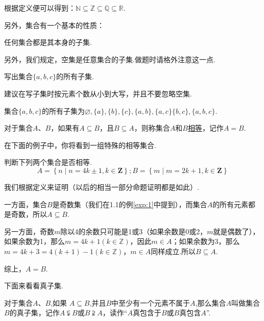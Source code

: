 \documentclass[lang=cn,math=cm,chinesefont=nofont,11pt,scheme=chinese,twocol]{elegantbook}
\begin{document}
根据定义便可以得到：$\mathbb{N}\subseteq\mathbb{Z}\subseteq\mathbb{Q}\subseteq\mathbb{R}$.

  另外，集合有一个基本的性质：
\begin{property}
  任何集合都是其本身的子集.
\end{property}

另外，我们规定，空集是任意集合的子集.做题时请格外注意这一点.

\begin{example}
  写出集合$\{a,b,c\}$的所有子集.
\end{example}
\begin{remark}
  建议在写子集时按元素个数从小到大写，并且不要忽略空集.
\end{remark}
\begin{solution}
  集合$\{a,b,c\}$的所有子集为$\varnothing ,\{a\},\{b\},\{c\},\{a,b\},\{a,c\}\{b,c\},\{a,b,c\}$.
\end{solution}
\begin{definition}[集合的相等]
  对于集合$A$、$B$，如果有$A\subseteq B$，且$B\subseteq A$，则称集合$A$和$B$\underline{相等}，记作$A=B$.
\end{definition}

在下面的例子中，你将看到一组特殊的相等集合.

\begin{example}\label{exp:2}
  判断下列两个集合是否相等.
  $$A=\left\{n\mid n=4k\pm1,k\in\mathbf{Z}\right\};B=\left\{m\mid m=2k+1,k\in\mathbf{Z}\right\}$$
\end{example}
\begin{solution}
  我们根据定义来证明（以后的相当一部分命题证明都是如此）.

一方面，集合$B$是奇数集（我们在1.1的例\ref{exp:1}中提到），而集合$A$的所有元素都是奇数，所以$A\subseteq B$.

另一方面，奇数$m$除以4的余数只可能是1或3（如果余数是0或2，$m$就是偶数了），如果余数为1，那么$m=4k+1(k\in\mathbb{Z})$，因此$m\in A$；如果余数为3，那么$m=4k+3=4(k+1)-1(k\in\mathbb{Z})$，$m\in A$同样成立.所以$B\subseteq A$.

综上，$A=B$.
\end{solution}

下面来看看真子集.
\begin{definition}[真子集]
  对于集合$A$、$B$,如果 $A\subseteq B$,并且$B$中至少有一个元素不属于$A$,那么集合$A$叫做集合$B$的真子集，记作$A\subsetneqq B$或$B\supsetneqq A$，读作“$A$真包含于$B$或$B$真包含$A$”.
\end{definition}
\end{document}
